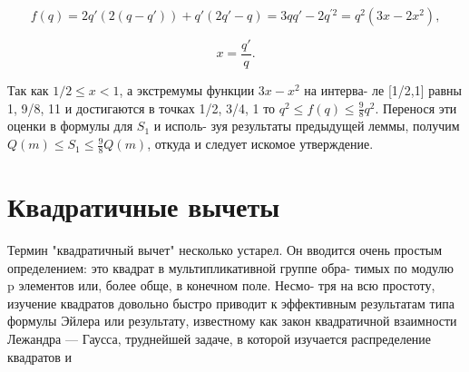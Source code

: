 \documentclass{../template/mai_book}
\begin{document}
\begin{myproof}
$$f(q) = 2q'(2(q - q')) + q'(2q' - q) = 3qq' - 2q^{'2} = q^{2}(3x - 2x^{2}), $$ \par 
$$x = \frac{q'}{q}. $$ \par 

Так как $1/2 \leqslant x < 1$, а экстремумы функции $3x - x^{2}$ на интерва- \linebreak \indent ле [1/2,1] равны 1, 9/8, 11 и достигаются в точках 1/2, 3/4, 1 то \linebreak \indent $q^2 \leqslant f(q) \leqslant\frac{9}{8}q^{2}.$ Перенося эти оценки в формулы для $S_{1}$ и исполь- \linebreak \indent зуя результаты предыдущей леммы, получим $Q(m) \leqslant S_{1} \leqslant \frac{9}{8}Q(m)$, \linebreak \indent откуда и следует искомое утверждение. \par 
\end{myproof}
\section{Квадратичные вычеты}

Термин "квадратичный вычет" несколько устарел. Он вводится очень \linebreak простым определением: это квадрат в мультипликативной группе обра- \linebreak тимых по модулю p элементов или, более обще, в конечном поле. Несмо- \linebreak тря на всю простоту, изучение квадратов довольно быстро приводит \linebreak к эффективным результатам типа формулы Эйлера или результату, \linebreak известному как закон квадратичной взаимности Лежандра --- Гаусса, труднейшей задаче, в которой изучается распределение квадратов и \linebreak \newpage 

\end{document}
